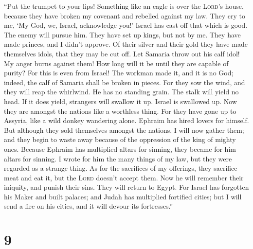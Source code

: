  ``Put the trumpet to your lips! Something like an eagle
is over the \textsc{Lord}'s house, because they have broken my covenant
and rebelled against my law.  They cry to me, `My God, we,
Israel, acknowledge you!'  Israel has cast off that which
is good. The enemy will pursue him.  They have set up
kings, but not by me. They have made princes, and I didn't approve. Of
their silver and their gold they have made themselves idols, that they
may be cut off.  Let Samaria throw out his calf idol! My
anger burns against them! How long will it be until they are capable of
purity?  For this is even from Israel! The workman made
it, and it is no God; indeed, the calf of Samaria shall be broken in
pieces.  For they sow the wind, and they will reap the
whirlwind. He has no standing grain. The stalk will yield no head. If it
does yield, strangers will swallow it up.  Israel is
swallowed up. Now they are amongst the nations like a worthless thing.
 For they have gone up to Assyria, like a wild donkey
wandering alone. Ephraim has hired lovers for himself. 
But although they sold themselves amongst the nations, I will now gather
them; and they begin to waste away because of the oppression of the king
of mighty ones.  Because Ephraim has multiplied altars
for sinning, they became for him altars for sinning.  I
wrote for him the many things of my law, but they were regarded as a
strange thing.  As for the sacrifices of my offerings,
they sacrifice meat and eat it, but the \textsc{Lord} doesn't accept
them. Now he will remember their iniquity, and punish their sins. They
will return to Egypt.  For Israel has forgotten his Maker
and built palaces; and Judah has multiplied fortified cities; but I will
send a fire on his cities, and it will devour its fortresses.''

\hypertarget{section-8}{%
\section{9}\label{section-8}}

